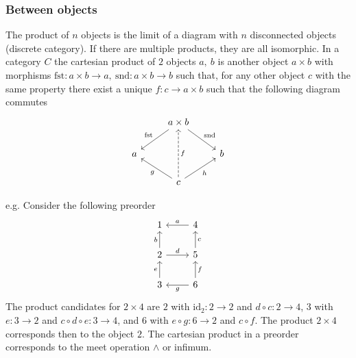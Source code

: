 \subsubsection*{Between objects}
 The product of $n$ objects is the limit of a diagram with $n$ disconnected
objects (discrete category). \parencite{adamek_herrlich_strecker:joy_cats} If there are multiple products, they are all isomorphic.
In a category $C$ the cartesian product of $2$ objects $a,\ b$ is another
object $a\times b$ with morphisms $\mathrm{fst}: a\times b \to a,
\ \mathrm{snd}: a\times b \to b$ such that, for any other object $c$ with the
same property there exist a unique $f:c \to a\times b$ such that the following
diagram commutes
\[\begin{tikzcd}
	& {a\times b} \\
	a && b \\
	& c
	\arrow["{\mathrm{fst}}"', from=1-2, to=2-1]
	\arrow["{\mathrm{snd}}", from=1-2, to=2-3]
	\arrow["f"', dashed, from=3-2, to=1-2]
	\arrow["g", from=3-2, to=2-1]
	\arrow["h"', from=3-2, to=2-3]
\end{tikzcd}\]

e.g.
Consider the following preorder
\[\begin{tikzcd}
	1 & 4 \\
	2 & 5 \\
	3 & 6
	\arrow["g", from=3-2, to=3-1]
	\arrow["f"', from=3-2, to=2-2]
	\arrow["c"', from=2-2, to=1-2]
	\arrow["e", from=3-1, to=2-1]
	\arrow["b", from=2-1, to=1-1]
	\arrow["a"', from=1-2, to=1-1]
	\arrow["d", from=2-1, to=2-2]
\end{tikzcd}\]
The product candidates for $2\times 4$ are $2$ with $\mathrm{id}_2 : 2\to 2$
and $d\circ c:2\to 4$, $3$ with $e: 3\to 2$ and $c\circ d\circ e: 3\to 4$,
and $6$ with $e \circ g: 6\to 2$ and $c\circ f$. The product $2\times 4$
corresponds then to the object $2$. The cartesian product in a
preorder corresponds to the meet operation $\land$ or infimum.
\parencite{fong:7sketches}

